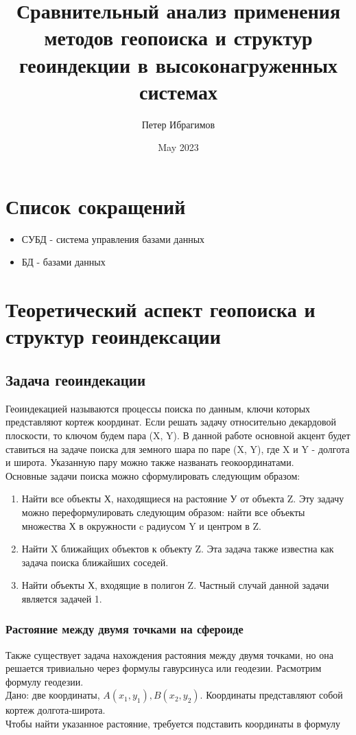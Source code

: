 \documentclass{article}
\title{Сравнительный анализ применения методов геопоиска и структур геоиндекции в высоконагруженных системах}
\author{Петер Ибрагимов}
\date{May 2023}
\begin{document}
\maketitle


\section{Список сокращений}
\begin{itemize}
    \item СУБД - система управления базами данных
    \item БД - базами данных

\end{itemize}
\section{Теоретический аспект геопоиска и структур геоиндексации}
\subsection{Задача геоиндекации}

Геоиндекацией называются процессы поиска по данным, ключи которых представляют кортеж координат. Если решать задачу относительно декардовой плоскости, то ключом будем пара (X, Y).  В данной работе основной акцент будет ставиться на задаче поиска для земного шара по паре (X, Y), где X и Y - долгота и широта. Указанную пару можно также названать геокоординатами.\\

Основные задачи поиска можно сформулировать следующим образом:
\begin{enumerate}
    \item Найти все объекты Х, находящиеся на растояние У от объекта Z. Эту задачу можно переформулировать следующим образом: найти все объекты множества Х в окружности c радиусом Y и центром в Z.
    \item Найти X ближайщих объектов к объекту Z. Эта задача также известна как задача поиска ближайших соседей.
    \item Найти объекты Х, входящие в полигон Z. Частный случай данной задачи является задачей 1.
\end{enumerate}
\subsubsection{Растояние между двумя точками на сфероиде}
Также существует задача нахождения растояния между двумя точками, но она решается тривиально через формулы гавурсинуса или геодезии. Расмотрим формулу геодезии. \\
Дано: две координаты, $A(x_1, y_1), B(x_2, y_2)$. Координаты представляют собой кортеж долгота-широта. \\
Чтобы найти указанное растояние, требуется подставить координаты в формулу
\end{document}
